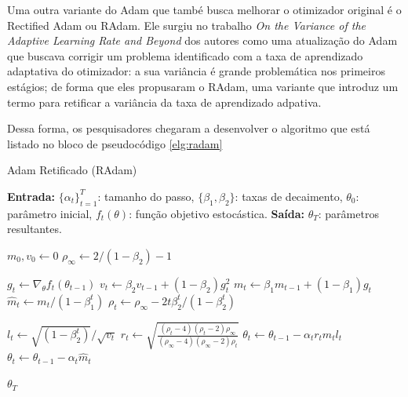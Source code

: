 Uma outra variante do Adam que també busca melhorar o otimizador original é o Rectified Adam ou RAdam. Ele surgiu no trabalho \textit{On the Variance of the Adaptive Learning Rate and Beyond} dos autores \textcite{RAdamMethod} como uma atualização do Adam que buscava corrigir um problema identificado com a taxa de aprendizado adaptativa do otimizador: a sua variância é grande problemática nos primeiros estágios; de forma que eles propusaram o RAdam, uma variante que introduz um termo para retificar a variância da taxa de aprendizado adpativa.

Dessa forma, os pesquisadores chegaram a desenvolver o algoritmo que está listado no bloco de pseudocódigo \ref{elg:radam}

\begin{algorithm}[H]
\caption{Adam Retificado (RAdam)}
\label{alg:radam}
\begin{algorithmic}[1]

\State \textbf{Entrada:} $\{\alpha_t\}_{t=1}^T$: tamanho do passo, $\{\beta_1, \beta_2\}$: taxas de decaimento, $\theta_0$: parâmetro inicial, $f_t(\theta)$: função objetivo estocástica.
\State \textbf{Saída:} $\theta_T$: parâmetros resultantes.

\State $m_0, v_0 \leftarrow 0$ 
\State $\rho_{\infty} \leftarrow 2 / (1 - \beta_2) - 1$ 

    \State $g_t \leftarrow \nabla_\theta f_t(\theta_{t-1})$ 
    \State $v_t \leftarrow \beta_2 v_{t-1} + (1 - \beta_2) g_t^2$ 
    \State $m_t \leftarrow \beta_1 m_{t-1} + (1 - \beta_1) g_t$ 
    \State $\hat{m}_t \leftarrow m_t / (1 - \beta_1^t)$ 
    \State $\rho_t \leftarrow \rho_{\infty} - 2t \beta_2^t / (1 - \beta_2^t)$ 
    
        \State $l_t \leftarrow \sqrt{(1 - \beta_2^t)} / \sqrt{v_t}$ 
        \State $r_t \leftarrow \sqrt{\frac{(\rho_t - 4)(\rho_t - 2)\rho_{\infty}}{(\rho_{\infty} - 4)(\rho_{\infty} - 2)\rho_t}}$ 
        \State $\theta_t \leftarrow \theta_{t-1} - \alpha_t r_t \hat{m}_t l_t$ 
    \Else
        \State $\theta_t \leftarrow \theta_{t-1} - \alpha_t \hat{m}_t$ 
    \EndIf
\EndFor

\State \Return $\theta_T$
\end{algorithmic}
\end{algorithm}

